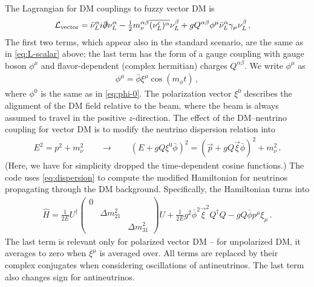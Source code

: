 \documentclass{scrartcl}
\begin{document}
The Lagrangian for DM couplings to fuzzy vector DM is \cite{Brdar:2017kbt}
\begin{align}
  \mathcal{L}_\text{vector}
    &= \bar\nu_L^\alpha i \slashed\partial \nu_L^\alpha
     - \tfrac{1}{2} m_\nu^{\alpha\beta} \overline{(\nu_L^c)^\alpha} \nu_L^\beta
     + g Q^{\alpha\beta} \phi^\mu \bar{\nu}_L^\alpha \gamma_\mu \nu_L^\beta \,,
  \label{eq:L-vector}
\end{align}
The first two terms, which appear also in the standard scenario,  are the
same as in \cref{eq:L-scalar} above; the last term has the form of a gauge
coupling with gauge boson $\phi^\mu$ and flavor-dependent (complex hermitian)
charges $Q^{\alpha\beta}$.  We write $\phi^\mu$ as
\begin{align}
  \phi^\mu = \bar\phi \xi^\mu \cos(m_\phi t) \,,
  \label{eq:phi-osc-vector}
\end{align}
where $\phi^0$ is the same as in \cref{eq:phi-0}.  The polarization vector $\xi^0$
describes the alignment of the DM field relative to the beam, where the
beam is always assumed to travel in the positive $z$-direction.
The effect of the DM--neutrino coupling for vector DM is to modify the neutrino
dispersion relation into
\begin{align}
  E^2 = p^2 + m_\nu^2  \qquad\to\qquad
  (E + g Q \xi^0 \bar\phi)^2 = (\vec{p} + g Q \vec\xi \bar\phi)^2 + m_\nu^2 \,.
  \label{eq:dispersion}
\end{align}
(Here, we have for simplicity dropped the time-dependent cosine functions.)
The code uses \cref{eq:dispersion} to compute the modified Hamiltonian for
neutrinos propagating through the DM background.  Specifically, the Hamiltonian
turns into
\begin{align}
  \hat{H} = \frac{1}{2E} U^\dag \begin{pmatrix}
                                  0 &                 &                  \\
                                    & \Delta m_{21}^2 &                  \\
                                    &                 & \Delta m_{31}^2
                                \end{pmatrix}  U
          + \frac{1}{2 E} g^2 \bar\phi^2 \vec\xi^2 Q^\dag Q
          - g Q \bar\phi p^\mu \xi_\mu \,.
\end{align}
The last term is relevant only for polarized vector DM -- for unpolarized DM,
it averages to zero when $\xi^\mu$ is averaged over.  All terms are replaced
by their complex conjugates when considering oscillations of antineutrinos.
The last term also changes sign for antineutrinos.
\end{document}
